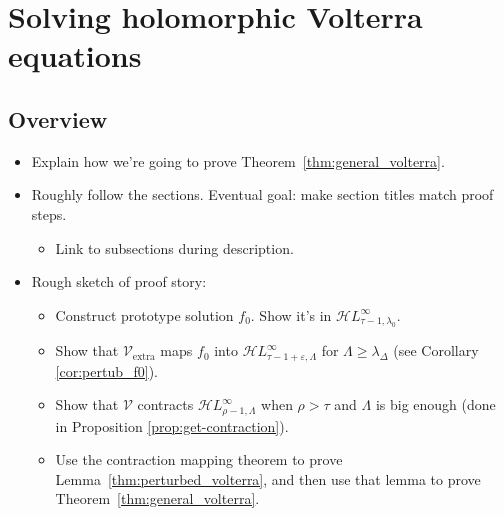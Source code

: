 \documentclass{article}
\theoremstyle{plain}
\newcommand{\singexp}[2]{\mathcal{H}L^\infty_{#1, #2}}
\newcommand{\expHoloL}[2]{\mathcal{H}L^{#1}_{#2}} %
\newcommand{\volterra}{\mathcal{V}}
\newcommand{\softpart}{\mathcal{V}_\text{extra}}
\newenvironment{brainstorm}{\color{violet}\begin{itemize}}{\end{itemize}\color{black}}
\begin{document}

\section{Solving holomorphic Volterra equations}
\subsection{Overview}
\begin{brainstorm}
\item Explain how we're going to prove Theorem~\ref{thm:general_volterra}.
\item Roughly follow the sections. Eventual goal: make section titles match proof steps.
\begin{itemize}
\item Link to subsections during description.
\end{itemize}
\item Rough sketch of proof story:
\begin{itemize}
    \item Construct prototype solution $f_0$. Show it's in $\singexp{\tau-1}{\lambda_0}$.
    \item Show that $\softpart$ maps $f_0$ into $\singexp{\tau-1+\varepsilon}{\Lambda}$ for $\Lambda\geq\lambda_\Delta$ (see Corollary \ref{cor:pertub_f0}).
    \item Show that $\volterra$ contracts $\singexp{\rho-1}{\Lambda}$ when $\rho > \tau$ and $\Lambda$ is big enough (done in Proposition \ref{prop:get-contraction}).
    \item Use the contraction mapping theorem to prove Lemma~\ref{thm:perturbed_volterra}, and then use that lemma to prove Theorem~\ref{thm:general_volterra}.
\end{itemize}
\end{brainstorm}
\end{document}
